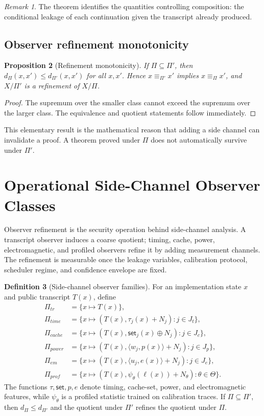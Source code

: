 \documentclass[11pt]{article}
\theoremstyle{definition}
\newtheorem{definition}{Definition}[section]
\theoremstyle{plain}
\newtheorem{proposition}[definition]{Proposition}
\theoremstyle{remark}
\newtheorem{remark}[definition]{Remark}
\begin{document}
\begin{remark}
The theorem identifies the quantities controlling composition: the conditional leakage of each continuation given the transcript already produced.
\end{remark}

\subsection{Observer refinement monotonicity}

\begin{proposition}[Refinement monotonicity]
If $\Pi\subseteq\Pi'$, then $d_{\Pi}(x,x')\le d_{\Pi'}(x,x')$ for all $x,x'$. Hence $x\equiv_{\Pi'}x'$ implies $x\equiv_{\Pi}x'$, and $X/\Pi'$ is a refinement of $X/\Pi$.
\end{proposition}

\begin{proof}
The supremum over the smaller class cannot exceed the supremum over the larger class. The equivalence and quotient statements follow immediately.
\end{proof}

This elementary result is the mathematical reason that adding a side channel can invalidate a proof. A theorem proved under $\Pi$ does not automatically survive under $\Pi'$.



\section{Operational Side-Channel Observer Classes}

Observer refinement is the security operation behind side-channel analysis. A transcript observer induces a coarse quotient; timing, cache, power, electromagnetic, and profiled observers refine it by adding measurement channels. The refinement is measurable once the leakage variables, calibration protocol, scheduler regime, and confidence envelope are fixed.

\begin{definition}[Side-channel observer families]
For an implementation state $x$ and public transcript $T(x)$, define
\begin{align*}
\Pi_{tr} &= \{x\mapsto T(x)\},\\
\Pi_{time} &= \{x\mapsto (T(x),\tau_j(x)+N_j): j\in J_t\},\\
\Pi_{cache} &= \{x\mapsto (T(x),\mathsf{set}_j(x)\oplus N_j): j\in J_c\},\\
\Pi_{power} &= \{x\mapsto (T(x),\langle w_j,p(x)\rangle+N_j): j\in J_p\},\\
\Pi_{em} &= \{x\mapsto (T(x),\langle u_j,e(x)\rangle+N_j): j\in J_e\},\\
\Pi_{prof} &= \{x\mapsto (T(x),\psi_\theta(\ell(x))+N_\theta): \theta\in\Theta\}.
\end{align*}
The functions $\tau,\mathsf{set},p,e$ denote timing, cache-set, power, and electromagnetic features, while $\psi_\theta$ is a profiled statistic trained on calibration traces. If $\Pi\subseteq\Pi'$, then $d_\Pi\le d_{\Pi'}$ and the quotient under $\Pi'$ refines the quotient under $\Pi$.
\end{definition}
\end{document}
